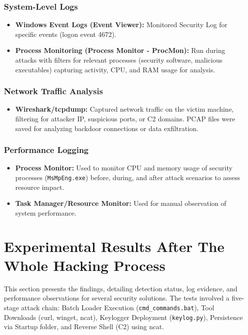 \documentclass[11pt]{article}
\begin{document}
	\subsubsection{System-Level Logs}
	\begin{itemize}
		\item \textbf{Windows Event Logs (Event Viewer):} Monitored Security Log for specific events (logon event 4672).
		\item \textbf{Process Monitoring (Process Monitor - ProcMon):} Run during attacks with filters for relevant processes (security software, malicious executables) capturing activity, CPU, and RAM usage for analysis.
	\end{itemize}
	
	\subsubsection{Network Traffic Analysis}
	\begin{itemize}
		\item \textbf{Wireshark/tcpdump:} Captured network traffic on the victim machine, filtering for attacker IP, suspicious ports, or C2 domains. PCAP files were saved for analyzing backdoor connections or data exfiltration.
	\end{itemize}
	
	\subsubsection{Performance Logging}
	\begin{itemize}
		\item \textbf{Process Monitor:} Used to monitor CPU and memory usage of security processes (\texttt{MsMpEng.exe}) before, during, and after attack scenarios to assess resource impact.
		\item \textbf{Task Manager/Resource Monitor:} Used for manual observation of system performance.
	\end{itemize}

	
	\section{Experimental Results After The Whole Hacking Process}
	\color{black} %
	This section presents the findings, detailing detection status, log evidence, and performance observations for several security solutions. The tests involved a five-stage attack chain: Batch Loader Execution (\texttt{cmd\_commands.bat}), Tool Downloads (curl, winget, ncat), Keylogger Deployment (\texttt{keylog.py}), Persistence via Startup folder, and Reverse Shell (C2) using ncat.
	
\end{document}
